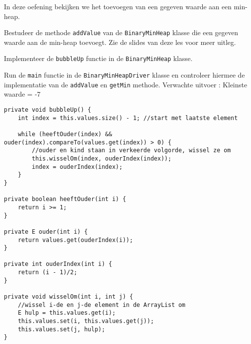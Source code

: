 \begin{oef}
\code In deze oefening bekijken we het toevoegen van een gegeven waarde aan een min-heap.
\begin{oefenumerate}
	\item Bestudeer de methode \verb=addValue= van de \verb=BinaryMinHeap= klasse die een gegeven waarde aan de min-heap toevoegt. Zie de slides van deze les voor meer uitleg.
	\item Implementeer de \verb=bubbleUp= functie in de \verb=BinaryMinHeap= klasse.
	\item Run de \verb=main= functie in de \verb=BinaryMinHeapDriver= klasse en controleer hiermee de implementatie van de \verb=addValue= en \verb=getMin= methode. \newline Verwachte uitvoer : \newline [-7, -4, -2, 0, 1, 2, -1, 3, 2] \newline Kleinste waarde = -7
\end{oefenumerate}
\begin{opl}
\begin{lstlisting}[caption={bubbleUp methode}, label=minheapbubbleUp]
private void bubbleUp() {
	int index = this.values.size() - 1; //start met laatste element
		
	while (heeftOuder(index) && ouder(index).compareTo(values.get(index)) > 0) {
		//ouder en kind staan in verkeerde volgorde, wissel ze om
		this.wisselOm(index, ouderIndex(index));
		index = ouderIndex(index);
	}
}

private boolean heeftOuder(int i) {
	return i >= 1;
}

private E ouder(int i) {
	return values.get(ouderIndex(i));
}

private int ouderIndex(int i) {
	return (i - 1)/2;
}
	
private void wisselOm(int i, int j) {
	//wissel i-de en j-de element in de ArrayList om
	E hulp = this.values.get(i);
	this.values.set(i, this.values.get(j));
	this.values.set(j, hulp);
}
\end{lstlisting}
\end{opl}
\end{oef}




